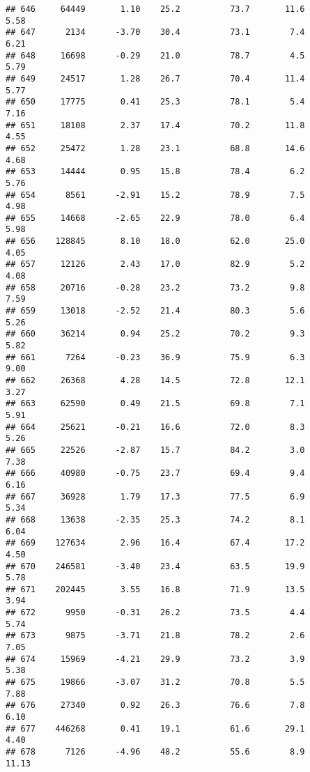 \documentclass[
]{article}
\begin{document}
\begin{verbatim}
## 646     64449       1.10    25.2          73.7       11.6              5.58
## 647      2134      -3.70    30.4          73.1        7.4              6.21
## 648     16698      -0.29    21.0          78.7        4.5              5.79
## 649     24517       1.28    26.7          70.4       11.4              5.77
## 650     17775       0.41    25.3          78.1        5.4              7.16
## 651     18108       2.37    17.4          70.2       11.8              4.55
## 652     25472       1.28    23.1          68.8       14.6              4.68
## 653     14444       0.95    15.8          78.4        6.2              5.76
## 654      8561      -2.91    15.2          78.9        7.5              4.98
## 655     14668      -2.65    22.9          78.0        6.4              5.98
## 656    128845       8.10    18.0          62.0       25.0              4.05
## 657     12126       2.43    17.0          82.9        5.2              4.08
## 658     20716      -0.28    23.2          73.2        9.8              7.59
## 659     13018      -2.52    21.4          80.3        5.6              5.26
## 660     36214       0.94    25.2          70.2        9.3              5.82
## 661      7264      -0.23    36.9          75.9        6.3              9.00
## 662     26368       4.28    14.5          72.8       12.1              3.27
## 663     62590       0.49    21.5          69.8        7.1              5.91
## 664     25621      -0.21    16.6          72.0        8.3              5.26
## 665     22526      -2.87    15.7          84.2        3.0              7.38
## 666     40980      -0.75    23.7          69.4        9.4              6.16
## 667     36928       1.79    17.3          77.5        6.9              5.34
## 668     13638      -2.35    25.3          74.2        8.1              6.04
## 669    127634       2.96    16.4          67.4       17.2              4.50
## 670    246581      -3.40    23.4          63.5       19.9              5.78
## 671    202445       3.55    16.8          71.9       13.5              3.94
## 672      9950      -0.31    26.2          73.5        4.4              5.74
## 673      9875      -3.71    21.8          78.2        2.6              7.05
## 674     15969      -4.21    29.9          73.2        3.9              5.38
## 675     19866      -3.07    31.2          70.8        5.5              7.88
## 676     27340       0.92    26.3          76.6        7.8              6.10
## 677    446268       0.41    19.1          61.6       29.1              4.40
## 678      7126      -4.96    48.2          55.6        8.9             11.13

\end{verbatim}
\end{document}
